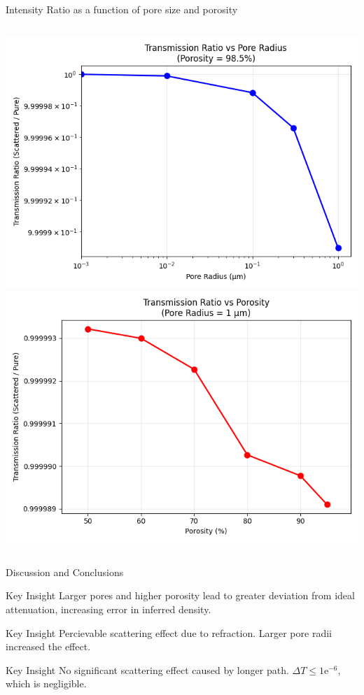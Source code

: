 \documentclass[aspectratio=169,xcolor=dvipsnames]{beamer}
\begin{document}
\begin{frame}{Intensity Ratio as a function of pore size and porosity}
  \begin{columns}
    \includegraphics[width=\textwidth]{transmissionvspore1.png}
    \includegraphics[width=\textwidth]{transmissionvsporosity1.png}
  \end{columns}
\end{frame}


\begin{frame}{Discussion and Conclusions}
\begin{block}{Key Insight}
  Larger pores and higher porosity lead to greater deviation from ideal attenuation, increasing error in inferred density.
\end{block}
\begin{block}{Key Insight}
    Percievable scattering effect due to refraction. Larger pore radii increased the effect.
\end{block}
\begin{block}{Key Insight}
    No significant scattering effect caused by longer path. $\Delta{T}\leq 1\text{e}^{-6}$, which is negligible.
\end{block}

\end{frame}
\end{document}
